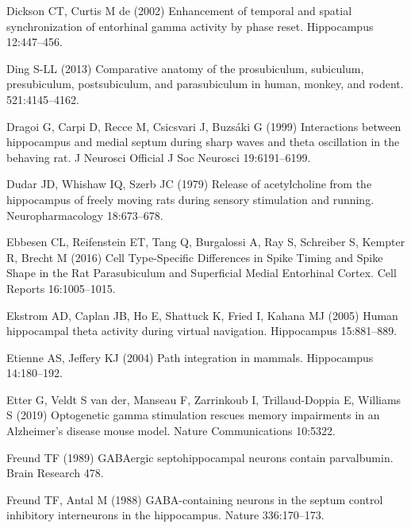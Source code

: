 \documentclass[
  12pt,
  a4paper,
  openany]{book}
\newlength{\cslhangindent}
\newlength{\cslentryspacingunit} %
\newenvironment{CSLReferences}[2] %
 {%
  \setlength{\parindent}{0pt}
  \ifodd #1
  \let\oldpar\par
  \def\par{\hangindent=\cslhangindent\oldpar}
  \fi
  \setlength{\parskip}{#2\cslentryspacingunit}
 }%
 {}
\begin{document}
\begin{CSLReferences}{1}{0}
\leavevmode{}%
Dickson CT, Curtis M de (2002) Enhancement of temporal and spatial synchronization of entorhinal gamma activity by phase reset. Hippocampus 12:447--456.

\leavevmode{}%
Ding S-LL (2013) Comparative anatomy of the prosubiculum, subiculum, presubiculum, postsubiculum, and parasubiculum in human, monkey, and rodent. 521:4145--4162.

\leavevmode{}%
Dragoi G, Carpi D, Recce M, Csicsvari J, Buzsáki G (1999) Interactions between hippocampus and medial septum during sharp waves and theta oscillation in the behaving rat. J Neurosci Official J Soc Neurosci 19:6191--6199.

\leavevmode{}%
Dudar JD, Whishaw IQ, Szerb JC (1979) Release of acetylcholine from the hippocampus of freely moving rats during sensory stimulation and running. Neuropharmacology 18:673--678.

\leavevmode{}%
Ebbesen CL, Reifenstein ET, Tang Q, Burgalossi A, Ray S, Schreiber S, Kempter R, Brecht M (2016) Cell {Type}-{Specific} {Differences} in {Spike} {Timing} and {Spike} {Shape} in the {Rat} {Parasubiculum} and {Superficial} {Medial} {Entorhinal} {Cortex}. Cell Reports 16:1005--1015.

\leavevmode{}%
Ekstrom AD, Caplan JB, Ho E, Shattuck K, Fried I, Kahana MJ (2005) Human hippocampal theta activity during virtual navigation. Hippocampus 15:881--889.

\leavevmode{}%
Etienne AS, Jeffery KJ (2004) Path integration in mammals. Hippocampus 14:180--192.

\leavevmode{}%
Etter G, Veldt S van der, Manseau F, Zarrinkoub I, Trillaud-Doppia E, Williams S (2019) Optogenetic gamma stimulation rescues memory impairments in an {Alzheimer}{'}s disease mouse model. Nature Communications 10:5322.

\leavevmode{}%
Freund TF (1989) {GABAergic} septohippocampal neurons contain parvalbumin. Brain Research 478.

\leavevmode{}%
Freund TF, Antal M (1988) {GABA}-containing neurons in the septum control inhibitory interneurons in the hippocampus. Nature 336:170--173.


\end{CSLReferences}
\end{document}
